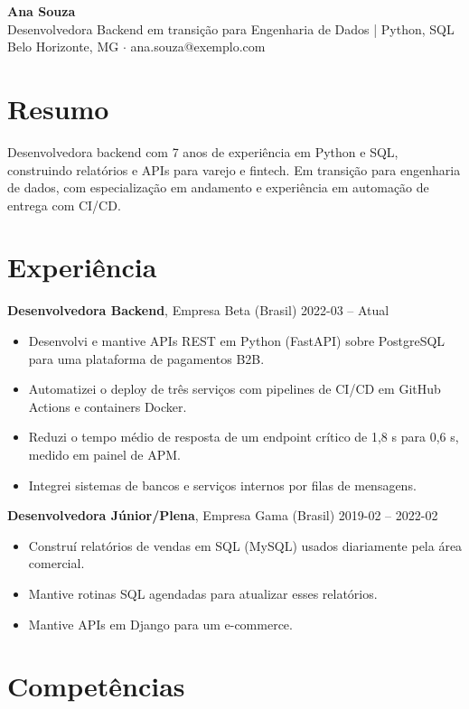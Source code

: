 \documentclass[10pt,a4paper]{article}
\begin{document}
{\LARGE\bfseries Ana Souza}\\[2pt]
{\large Desenvolvedora Backend em transição para Engenharia de Dados | Python, SQL}\\[2pt]
Belo Horizonte, MG $\cdot$ ana.souza@exemplo.com

\section*{Resumo}

Desenvolvedora backend com 7 anos de experiência em Python e SQL, construindo relatórios e APIs para varejo e fintech. Em transição para engenharia de dados, com especialização em andamento e experiência em automação de entrega com CI/CD.

\section*{Experiência}

\textbf{Desenvolvedora Backend}, Empresa Beta (Brasil) \hfill 2022-03 -- Atual\\
\begin{itemize}
  \item Desenvolvi e mantive APIs REST em Python (FastAPI) sobre PostgreSQL para uma plataforma de pagamentos B2B.
  \item Automatizei o deploy de três serviços com pipelines de CI/CD em GitHub Actions e containers Docker.
  \item Reduzi o tempo médio de resposta de um endpoint crítico de 1,8 s para 0,6 s, medido em painel de APM.
  \item Integrei sistemas de bancos e serviços internos por filas de mensagens.
\end{itemize}
\textbf{Desenvolvedora Júnior/Plena}, Empresa Gama (Brasil) \hfill 2019-02 -- 2022-02\\
\begin{itemize}
  \item Construí relatórios de vendas em SQL (MySQL) usados diariamente pela área comercial.
  \item Mantive rotinas SQL agendadas para atualizar esses relatórios.
  \item Mantive APIs em Django para um e-commerce.
\end{itemize}

\section*{Competências}
\end{document}

